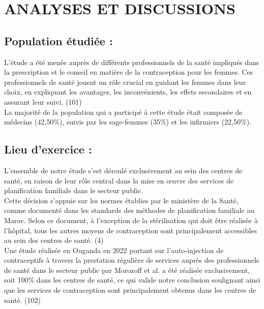 \section{ANALYSES ET DISCUSSIONS  }

\subsection{Population étudiée :}

L’étude a été menée auprès de différents professionnels de la santé impliqués dans la prescription et le conseil en matière de la contraception pour les femmes. Ces professionnels de santé jouent un rôle crucial en guidant les femmes dans leur choix, en expliquant les avantages, les inconvénients, les effets secondaires et en assurant leur suivi. (101) \\

\noindent La majorité de la population qui a participé à cette étude était composée de médecins (42,50\%), suivis par les sage-femmes (35\%) et les infirmiers (22,50\%). 

\subsection{Lieu d’exercice :}

\noindent L'ensemble de notre étude s'est déroulé exclusivement au sein des centres de santé, en raison de leur rôle central dans la mise en œuvre des services de planification familiale dans le secteur public.\\

\noindent Cette décision s'appuie sur les normes établies par le ministère de la Santé, comme documenté dans les standards des méthodes de planification familiale au Maroc. Selon ce document, à l'exception de la stérilisation qui doit être réalisée à l'hôpital, tous les autres moyens de contraception sont principalement accessibles au sein des centres de santé. (4) \\

\noindent Une étude réalisée en Ouganda en 2022 portant sur l’auto-injection de contraceptifs à travers la prestation régulière de services auprès des professionnels de santé dans le secteur public par Morozoff et al. a été réalisée exclusivement, soit 100\% dans les centres de santé,  ce qui valide notre conclusion soulignant ainsi que les services de contraception sont principalement obtenus dans les centres de santé. (102)\\

